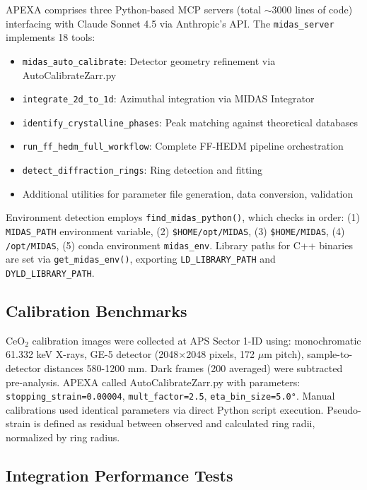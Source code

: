 \documentclass[11pt]{article}
\begin{document}
APEXA comprises three Python-based MCP servers (total $\sim$3000 lines of code) interfacing with Claude Sonnet 4.5 via Anthropic's API. The \texttt{midas\_server} implements 18 tools:

\begin{itemize}
    \item \texttt{midas\_auto\_calibrate}: Detector geometry refinement via AutoCalibrateZarr.py
    \item \texttt{integrate\_2d\_to\_1d}: Azimuthal integration via MIDAS Integrator
    \item \texttt{identify\_crystalline\_phases}: Peak matching against theoretical databases
    \item \texttt{run\_ff\_hedm\_full\_workflow}: Complete FF-HEDM pipeline orchestration
    \item \texttt{detect\_diffraction\_rings}: Ring detection and fitting
    \item Additional utilities for parameter file generation, data conversion, validation
\end{itemize}

Environment detection employs \texttt{find\_midas\_python()}, which checks in order: (1) \texttt{MIDAS\_PATH} environment variable, (2) \texttt{\$HOME/opt/MIDAS}, (3) \texttt{\$HOME/MIDAS}, (4) \texttt{/opt/MIDAS}, (5) conda environment \texttt{midas\_env}. Library paths for C++ binaries are set via \texttt{get\_midas\_env()}, exporting \texttt{LD\_LIBRARY\_PATH} and \texttt{DYLD\_LIBRARY\_PATH}.

\subsection{Calibration Benchmarks}

CeO$_2$ calibration images were collected at APS Sector 1-ID using: monochromatic 61.332 keV X-rays, GE-5 detector (2048$\times$2048 pixels, 172 $\mu$m pitch), sample-to-detector distances 580-1200 mm. Dark frames (200 averaged) were subtracted pre-analysis. APEXA called AutoCalibrateZarr.py with parameters: \texttt{stopping\_strain=0.00004}, \texttt{mult\_factor=2.5}, \texttt{eta\_bin\_size=5.0°}. Manual calibrations used identical parameters via direct Python script execution. Pseudo-strain is defined as residual between observed and calculated ring radii, normalized by ring radius.

\subsection{Integration Performance Tests}
\end{document}
